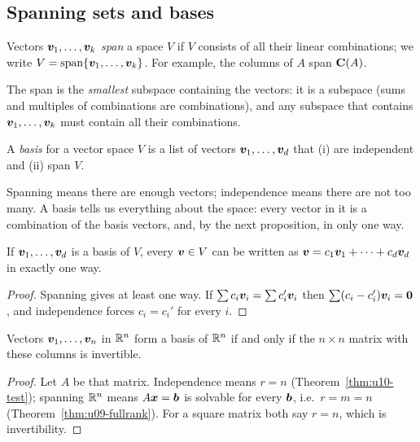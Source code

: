 \subsection{Spanning sets and bases}

\begin{definition}[Span]\label{def:u10-span}
Vectors $\boldsymbol{v}_1,\dots,\boldsymbol{v}_k$ \emph{span} a space $V$ if $V$ consists of all their linear
combinations; we write $V=\operatorname{span}\{\boldsymbol{v}_1,\dots,\boldsymbol{v}_k\}$. For example, the columns of $A$ span
$\mathbf{C}(A)$.
\end{definition}

The span is the \emph{smallest} subspace containing the vectors: it is a subspace (sums and multiples
of combinations are combinations), and any subspace that contains $\boldsymbol{v}_1,\dots,\boldsymbol{v}_k$ must
contain all their combinations.

\begin{definition}[Basis]\label{def:u10-basis}
A \emph{basis} for a vector space $V$ is a list of vectors $\boldsymbol{v}_1,\dots,\boldsymbol{v}_d$ that (i) are
independent and (ii) span $V$.
\end{definition}

Spanning means there are enough vectors; independence means there are not too many. A basis tells
us everything about the space: every vector in it is a combination of the basis vectors, and, by the
next proposition, in only one way.

\begin{proposition}\label{prop:u10-unique}
If $\boldsymbol{v}_1,\dots,\boldsymbol{v}_d$ is a basis of $V$, every $\boldsymbol{v}\in V$ can be written as
$\boldsymbol{v}=c_1\boldsymbol{v}_1+\dots+c_d\boldsymbol{v}_d$ in exactly one way.
\end{proposition}
\begin{proof}
Spanning gives at least one way. If $\sum c_i\boldsymbol{v}_i=\sum c_i'\boldsymbol{v}_i$ then
$\sum(c_i-c_i')\boldsymbol{v}_i=\boldsymbol{0}$, and independence forces $c_i=c_i'$ for every $i$.
\end{proof}

\begin{proposition}\label{prop:u10-Rn}
Vectors $\boldsymbol{v}_1,\dots,\boldsymbol{v}_n$ in $\mathbb{R}^n$ form a basis of $\mathbb{R}^n$ if and only if the $n\times n$
matrix with these columns is invertible.
\end{proposition}
\begin{proof}
Let $A$ be that matrix. Independence means $r=n$ (Theorem~\ref{thm:u10-test}); spanning $\mathbb{R}^n$ means
$A\boldsymbol{x}=\boldsymbol{b}$ is solvable for every $\boldsymbol{b}$, i.e.\ $r=m=n$ (Theorem~\ref{thm:u09-fullrank}).
For a square matrix both say $r=n$, which is invertibility.
\end{proof}

